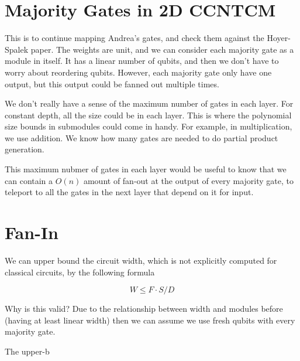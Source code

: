 \documentclass{article}
\begin{document}
\section{Majority Gates in 2D CCNTCM}

This is to continue mapping Andrea's gates, and check them against
the Hoyer-Spalek paper. The weights are unit, and we can consider
each majority gate as a module in itself. It has a linear number
of qubits, and then we don't have to worry about reordering qubits.
However, each majority gate only have one output, but this output
could be fanned out multiple times.

We don't really have a sense of the maximum number of gates in each
layer. For constant depth, all the size could be in each layer.
This is where the polynomial size bounds in submodules could
come in handy. For example, in multiplication, we use addition.
We know how many gates are needed to do partial product generation.

This maximum nubmer of gates in each layer would be useful to know
that we can contain a $O(n)$ amount of fan-out at the output of
every majority gate, to teleport to all the gates in the next layer
that depend on it for input.

\section{Fan-In}

We can upper bound the circuit width, which is not explicitly computed
for classical circuits, by the following formula

\begin{equation}
W \le F \cdot S / D
\end{equation}

Why is this valid? Due to the relationship between width and modules before
(having at least linear width) then we can assume we use fresh qubits
with every majority gate.

The upper-b
\end{document}
